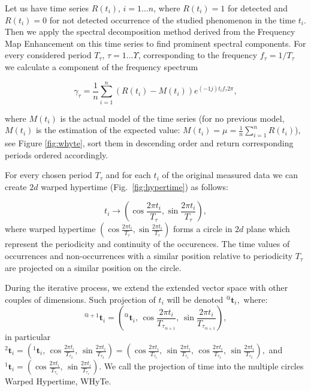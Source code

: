 Let us have time series $R\left(t_{i}\right)$, $i = 1 \ldots n$, where $R\left(t_{i}\right) = 1$ for detected and $R\left(t_{i}\right) = 0$ for not detected occurrence of the studied phenomenon in the time $t_{i}$.
Then we apply the spectral decomposition method derived from the Frequency Map Enhancement \cite{krajnik2017fremen} on this time series to find prominent spectral components.
For every considered period $T_{\tau}$, $\tau = 1 \ldots \Upsilon$, corresponding to the frequency ${f}_{\tau} = 1 / T_{\tau}$ we calculate a component of the frequency spectrum

\begin{equation}\label{eq:components}
\gamma_{\tau} = \frac{1}{n} \sum_{i = 1}^{n} (R\left(t_{i}\right)-M\left(t_{i}\right))e^{(-1j)t_{i}{f}_{\tau}2\pi},
\end{equation}

\noindent where $M\left(t_{i}\right)$ is the actual model of the time series (for no previous model, $M\left(t_{i}\right)$ is the estimation of the expected value: $M\left(t_{i}\right) = \mu = \frac{1}{n} \sum_{i = 1}^{n} R\left(t_{i}\right)$), see Figure \ref{fig:whyte}, sort them in descending order and return corresponding periods ordered accordingly.

For every chosen period $T_{\tau}$ and for each $t_i$ of the original measured data we can create $2d$ warped hypertime (Fig.~\ref{fig:hypertime}) as follows:

\begin{equation}
t_i \rightarrow \left(\cos{\frac{2\pi t_{i}}{T_{\tau}}}, \sin{\frac{2\pi t_{i}}{T_{\tau}}}\right),
\end{equation}
%
where warped hypertime $\left(\cos{\frac{2\pi t_{i}}{T_{\tau}}}, \sin{\frac{2\pi t_{i}}{T_{\tau}}}\right)$ forms a circle in $2d$ plane which represent the periodicity and continuity of the occurences.
The time values of occurrences and non-occurrences with a similar position relative to periodicity $T_{\tau}$ are projected on a similar position on the circle.

During the iterative process, we extend the extended vector space with other couples of dimensions.
Such projection of $t_i$ will be denoted ${}^{@}\mathbf{t}_{i},$ where:
%
\begin{equation}\label{eqn:extension}
    {}^{@+1}\mathbf{t}_{i} = \left({}^{@}\mathbf{t}_{i}, \,\cos{\frac{2\pi t_{i}}{T_{\tau_{@+1}}}}, \, \sin{\frac{2\pi t_{i}}{T_{\tau_{@+1}}}}\right),
\end{equation}
%
in particular ${}^{2}\mathbf{t}_{i} =\left({}^{1}\mathbf{t}_{i}, \,\cos{\frac{2\pi t_{i}}{T_{\tau_2}}}, \, \sin{\frac{2\pi t_{i}}{T_{\tau_2}}}\right) =  \left(\cos{\frac{2\pi t_{i}}{T_{\tau_1}}}, \, \sin{\frac{2\pi t_{i}}{T_{\tau_1}}}, \,\cos{\frac{2\pi t_{i}}{T_{\tau_2}}}, \, \sin{\frac{2\pi t_{i}}{T_{\tau_2}}}\right),$ and
${}^{1}\mathbf{t}_{i} = \left(\cos{\frac{2\pi t_{i}}{T_{\tau_1}}}, \, \sin{\frac{2\pi t_{i}}{T_{\tau_1}}}\right)$.
We call the projection of time into the multiple circles Warped Hypertime, WHyTe.




